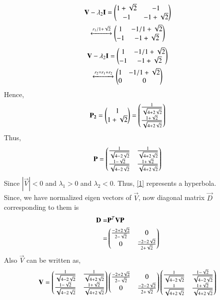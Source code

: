 \documentclass[journal,12pt,twocolumn]{IEEEtran}
\begin{document}
\begin{multline}
	\mathbf{V}-\lambda_2\mathbf{I} = \begin{pmatrix}1+\sqrt{2} & -1 \\ -1 & -1+\sqrt{2}\end{pmatrix}\\
	\xleftrightarrow[]{r_1/1+\sqrt{2}} \begin{pmatrix}1 & -1/1+\sqrt{2} \\ -1 & -1+\sqrt{2}\end{pmatrix}
\end{multline}
\begin{multline}
	\mathbf{V}-\lambda_2\mathbf{I} = \begin{pmatrix}1 & -1/1+\sqrt{2} \\ -1 & -1+\sqrt{2}\end{pmatrix} \\
	\xleftrightarrow[]{r_2 = r_1 + r_2} \begin{pmatrix}1 & -1/1+\sqrt{2} \\ 0 & 0\end{pmatrix}
\end{multline}
Hence,
\begin{align}
	\mathbf{P_2}= \begin{pmatrix}1\\1 + \sqrt{2} \end{pmatrix} = \begin{pmatrix}\frac{1}{\sqrt{4+2\sqrt{2}}} \\ \frac{1 + \sqrt{2}}{\sqrt{4+2\sqrt{2}}}\end{pmatrix}
\end{align}
Thus, 
\begin{align}
	\mathbf{P} = \begin{pmatrix}\frac{1}{\sqrt{4-2\sqrt{2}}} & \frac{1}{\sqrt{4+2\sqrt{2}}} \\ \frac{1-\sqrt{2}}{\sqrt{4-2\sqrt{2}}} & \frac{1 + \sqrt{2}}{\sqrt{4+2\sqrt{2}}} \end{pmatrix}
\end{align}
Since $|\vec{V}| <0$ and $\lambda_1 >0$ and $\lambda_2< 0$. Thus, \eqref{1} represents a hyperbola.\\
Since, we have normalized eigen vectors of $\vec{V}$, now diagonal matrix $\vec{D}$ corresponding to them is
\begin{align}
 \mathbf{D} = & \mathbf{P}^T\mathbf{V}\mathbf{P} \\
  = & \begin{pmatrix}\frac{-2 + 2\sqrt{2}}{2-\sqrt{2}} & 0 \\ 0 & \frac{-2-2\sqrt{2}}{2+\sqrt{2}}\end{pmatrix} 
\end{align} 
Also $\vec{V}$ can be written as,
\begin{align}
	\mathbf{V} = \begin{pmatrix}\frac{1}{\sqrt{4-2\sqrt{2}}} & \frac{1}{\sqrt{4+2\sqrt{2}}} \\ \frac{1-\sqrt{2}}{\sqrt{4-2\sqrt{2}}} & \frac{1 + \sqrt{2}}{\sqrt{4+2\sqrt{2}}}\end{pmatrix}
	\begin{pmatrix}\frac{-2 + 2\sqrt{2}}{2-\sqrt{2}} & 0 \\ 0 &\frac{-2-2\sqrt{2}}{2+\sqrt{2}}\end{pmatrix}
	\begin{pmatrix}\frac{1}{\sqrt{4-2\sqrt{2}}} & \frac{1-\sqrt{2}}{\sqrt{4-2\sqrt{2}}} \\ \frac{1}{\sqrt{4+2\sqrt{2}}}  & \frac{1 + \sqrt{2}}{\sqrt{4+2\sqrt{2}}}\end{pmatrix} \label{4}
\end{align}
\end{document}
